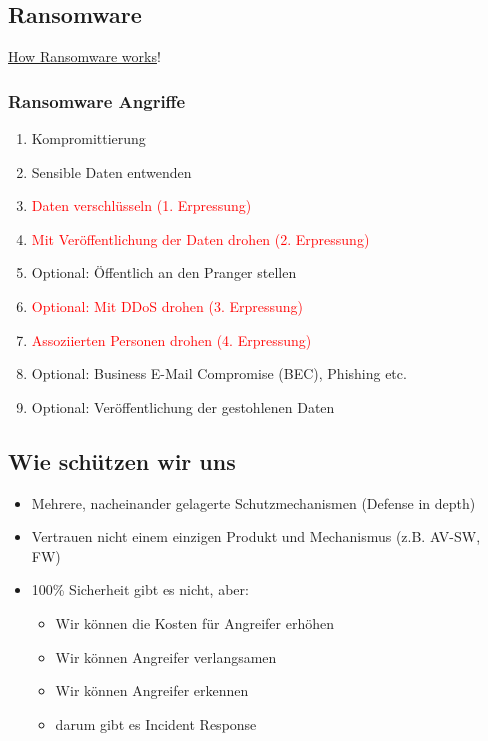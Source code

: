 \subsection{Ransomware}
\href{https://www.cert.govt.nz/business/guides/protecting-from-ransomware/}{How Ransomware works}!

\subsubsection{Ransomware Angriffe}
\begin{enumerate}
    \item Kompromittierung
    \item Sensible Daten entwenden
    \item \textcolor{red}{Daten verschlüsseln (1. Erpressung)}
    \item \textcolor{red}{Mit Veröffentlichung der Daten drohen (2. Erpressung)}
    \item Optional: Öffentlich an den Pranger stellen
    \item \textcolor{red}{Optional: Mit DDoS drohen (3. Erpressung)}
    \item \textcolor{red}{Assoziierten Personen drohen (4. Erpressung)}
    \item Optional: Business E-Mail Compromise (BEC), Phishing etc.
    \item Optional: Veröffentlichung der gestohlenen Daten
\end{enumerate}

\subsection{Wie schützen wir uns}
\begin{itemize}
    \item Mehrere, nacheinander gelagerte Schutzmechanismen (Defense in depth)
    \item Vertrauen nicht einem einzigen Produkt und Mechanismus (z.B. AV-SW, FW)
    \item 100\% Sicherheit gibt es nicht, aber:
    \begin{itemize}
        \item Wir können die Kosten für Angreifer erhöhen
        \item Wir können Angreifer verlangsamen
        \item Wir können Angreifer erkennen
        \item darum gibt es Incident Response
    \end{itemize}
\end{itemize}

\newpage